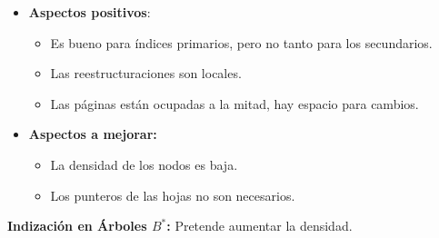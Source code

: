 \documentclass[12pt, twoside, openright]{report} %
\begin{document}
\begin{itemize}
\begin{itemize}
    \end{itemize}
  \item \textbf{Aspectos positivos}:
    

    \begin{itemize}
    \item Es bueno para índices primarios, pero no tanto para los
      secundarios.
      
    \item Las reestructuraciones son locales.
      
    \item Las páginas están ocupadas a la mitad, hay espacio para cambios.
      
    \end{itemize}
  \item \textbf{Aspectos a mejorar:}
    

    \begin{itemize}
    \item La densidad de los nodos es baja.
      
    \item Los punteros de las hojas no son necesarios.
      
    \end{itemize}
  \end{itemize}

  
  \textbf{Indización en Árboles $B^*$:} Pretende aumentar la densidad.
  
\end{document}
